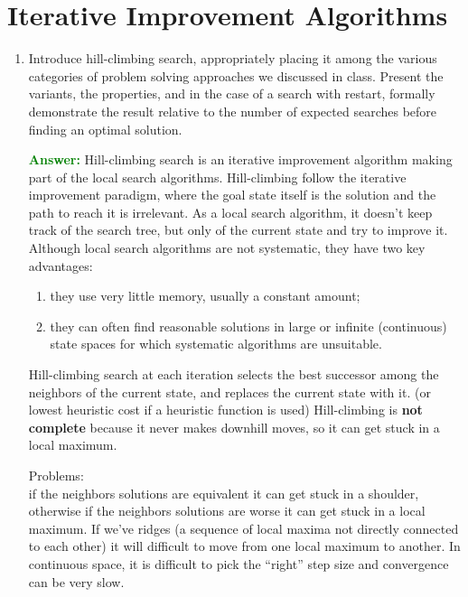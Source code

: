 \documentclass[12pt]{article}
\begin{document}
\section{Iterative Improvement Algorithms}\label{iterativeimprovement}
\begin{enumerate}[label=\textbf{II.\arabic*}]
    \item\label{q-hillclimbing}
    Introduce hill-climbing search, appropriately placing it among the various categories of problem solving approaches we discussed in class.
    Present the variants, the properties, and in the case of a search with restart, formally demonstrate the result relative to the number of expected searches before finding an optimal solution.

    \textcolor{green}{\textbf{Answer:}}
    Hill-climbing search is an iterative improvement algorithm making part of the local search algorithms.
    Hill-climbing follow the iterative improvement paradigm, where the goal state itself is the solution and the path to reach it is irrelevant.
    As a local search algorithm, it doesn't keep track of the search tree, but only of the current state and try to improve it.
    Although local search algorithms are not systematic, they have two key advantages:
    \begin{enumerate}
        \item they use very little memory, usually a constant amount;
        \item they can often find reasonable solutions in large or infinite (continuous) state spaces for which systematic algorithms are unsuitable.
    \end{enumerate} 
    Hill-climbing search at each iteration selects the best successor among the neighbors of the current state, and replaces the current state with it.
    (or lowest heuristic cost if a heuristic function is used)
    Hill-climbing is \textbf{not complete} because it never makes downhill moves, so it can get stuck in a local maximum.

    Problems:\\
    if the neighbors solutions are equivalent it can get stuck in a shoulder, otherwise if the neighbors solutions are worse it can get stuck in a local maximum.
    If we've ridges (a sequence of local maxima not directly connected to each other) it will difficult to move from one local maximum to another.
    In continuous space, it is difficult to pick the ``right'' step size and convergence can be very slow.
    


\end{enumerate}
\end{document}
